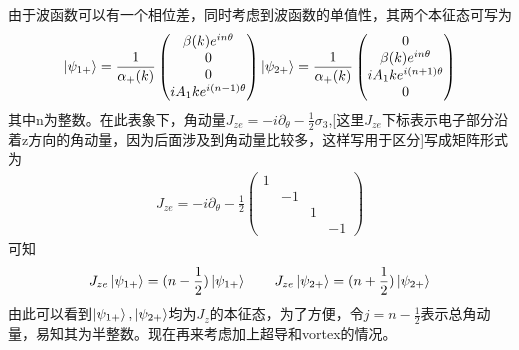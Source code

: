 \documentclass[22pt]{article}
\begin{document}
	由于波函数可以有一个相位差，同时考虑到波函数的单值性，其两个本征态可写为
	\begin{align}
		\ket{\psi_{1+}}=\frac{1}{\alpha_{+}(k)}
		\begin{pmatrix}
			\beta(k)e^{in\theta}\\
			0
			\\
			0\\
			iA_1ke^{i(n-1)\theta}
		\end{pmatrix}
		\ket{\psi_{2+}}=\frac{1}{\alpha_{+}(k)}
		\begin{pmatrix}
			0\\
			\beta(k)e^{in\theta}\\
			iA_1ke^{i(n+1)\theta}
			\\
			0
		\end{pmatrix}
	\end{align}
其中n为整数。在此表象下，角动量$J_{ze}=-i\partial_{\theta}-\frac{1}{2}\sigma_3$,[这里$J_{ze}$下标表示电子部分沿着z方向的角动量，因为后面涉及到角动量比较多，这样写用于区分]写成矩阵形式为
\begin{align}
	J_{ze}=-i\partial_{\theta}-\frac{1}{2}
	\begin{pmatrix}
		1&&&\\
		&-1&&\\
		&&1&\\
		&&&-1
	\end{pmatrix}
\end{align}
可知
\begin{align}
	J_{ze}\ket{\psi_{1+}}=(n-\frac{1}{2})\ket{\psi_{1+}}  \qquad  J_{ze}\ket{\psi_{2+}}=(n+\frac{1}{2})\ket{\psi_{2+}}
\end{align}
由此可以看到$\ket{\psi_{1+}},\ket{\psi_{2+}}$均为$J_z$的本征态，为了方便，令$j=n-\frac{1}{2}$表示总角动量，易知其为半整数。现在再来考虑加上超导和vortex的情况。
\end{document}

